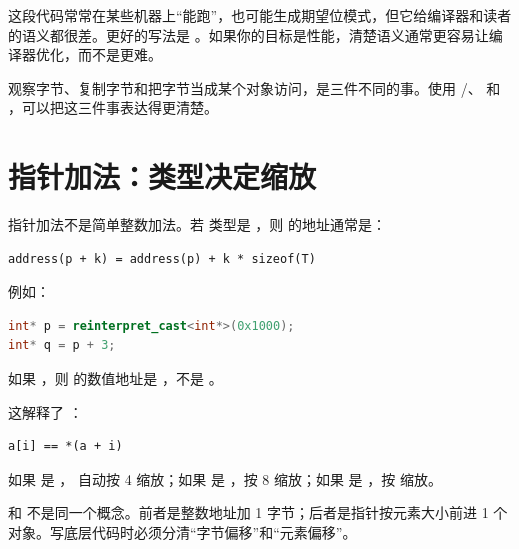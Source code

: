 这段代码常常在某些机器上“能跑”，也可能生成期望位模式，但它给编译器和读者的语义都很差。更好的写法是 。如果你的目标是性能，清楚语义通常更容易让编译器优化，而不是更难。

\begin{keyidea}
观察字节、复制字节和把字节当成某个对象访问，是三件不同的事。使用 /、 和 ，可以把这三件事表达得更清楚。
\end{keyidea}

\section{指针加法：类型决定缩放}

指针加法不是简单整数加法。若  类型是 ，则  的地址通常是：

\begin{center}
\begin{minipage}{0.76\linewidth}
\begin{verbatim}
address(p + k) = address(p) + k * sizeof(T)
\end{verbatim}
\end{minipage}
\end{center}

例如：

\begin{lstlisting}[language=C++]
int* p = reinterpret_cast<int*>(0x1000);
int* q = p + 3;
\end{lstlisting}

如果 ，则  的数值地址是 ，不是 。

这解释了 ：

\begin{center}
\begin{minipage}{0.7\linewidth}
\begin{verbatim}
a[i] == *(a + i)
\end{verbatim}
\end{minipage}
\end{center}

如果  是 ， 自动按 4 缩放；如果  是 ，按 8 缩放；如果  是 ，按  缩放。

\begin{warningbox}
 和  不是同一个概念。前者是整数地址加 1 字节；后者是指针按元素大小前进 1 个对象。写底层代码时必须分清“字节偏移”和“元素偏移”。
\end{warningbox}

